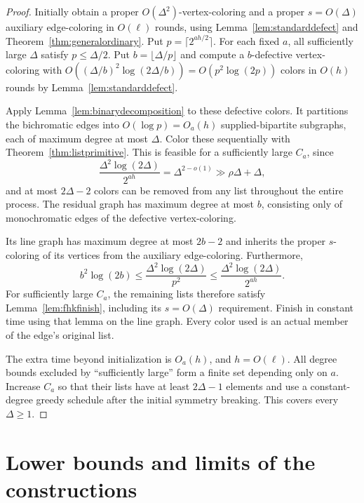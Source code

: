 \documentclass[11pt]{article}
\theoremstyle{definition}
\theoremstyle{remark}
\begin{document}
\begin{proof}
Initially obtain a proper $O(\Delta^2)$-vertex-coloring and a proper
$s=O(\Delta)$ auxiliary edge-coloring in $O(\ell)$ rounds, using
Lemma~\ref{lem:standarddefect} and Theorem~\ref{thm:generalordinary}.
Put $p=\lceil2^{ah/2}\rceil$.
For each fixed $a$, all sufficiently large $\Delta$ satisfy
$p\le\Delta/2$.  Put $b=\lfloor\Delta/p\rfloor$ and compute a
$b$-defective vertex-coloring with $O((\Delta/b)^2\log(2\Delta/b))=O(p^2\log(2p))$ colors
in $O(h)$ rounds by Lemma~\ref{lem:standarddefect}.

Apply Lemma~\ref{lem:binarydecomposition} to these defective colors.
It partitions the bichromatic edges into $O(\log p)=O_a(h)$
supplied-bipartite subgraphs, each of maximum degree at most $\Delta$.
Color these sequentially with Theorem~\ref{thm:listprimitive}.
This is feasible for a sufficiently large $C_a$, since
\[
 \frac{\Delta^2\log(2\Delta)}{2^{ah}}
   =\Delta^{2-o(1)}\gg \rho\Delta+\Delta,
\]
and at most $2\Delta-2$ colors can be removed from any list throughout
the entire process.  The residual graph has maximum degree at most
$b$, consisting only of monochromatic edges of the defective
vertex-coloring.

Its line graph has maximum degree at most $2b-2$ and inherits the
proper $s$-coloring of its vertices from the auxiliary edge-coloring.
Furthermore,
\[
 b^2\log(2b)
 \le\frac{\Delta^2\log(2\Delta)}{p^2}
 \le\frac{\Delta^2\log(2\Delta)}{2^{ah}}.
\]
For sufficiently large $C_a$, the remaining lists therefore satisfy
Lemma~\ref{lem:fhkfinish}, including its $s=O(\Delta)$ requirement.
Finish in constant time using that lemma on the line graph.  Every
color used is an actual member of the edge's original list.

The extra time beyond initialization is $O_a(h)$, and $h=O(\ell)$.
All degree bounds excluded by ``sufficiently large'' form a finite set
depending only on $a$.  Increase $C_a$ so that their lists have at
least $2\Delta-1$ elements and use a constant-degree greedy schedule
after the initial symmetry breaking.  This covers every $\Delta\ge1$.
\end{proof}

\section{Lower bounds and limits of the constructions}\label{sec:barriers}
\end{document}
